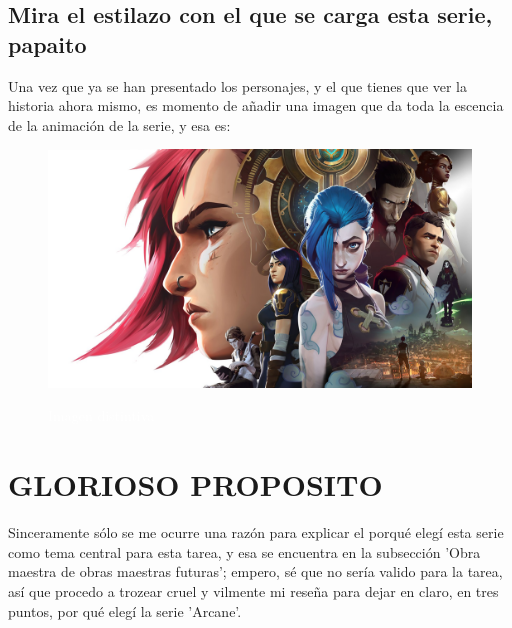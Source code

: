 \documentclass[11pt,A5]{article}
\begin{document}
    \subsection*{{\large{\textsf{\hspace{1cm}Mira el estilazo con el que se carga esta serie, papaito}}}}

Una vez que ya se han presentado los personajes, y el que tienes que ver la historia ahora mismo, es momento de añadir una imagen que da toda la escencia de la animación de la serie, y esa es:

\begin{figure}
    \raggedleft
    \caption*{\textcolor{white}{Imagen distintiva}}
    \includegraphics[scale=0.32, angle=15]{Pelicula. Imagenes usadas/Imagen representativa de Arcane.jpg}
    \label{fig:my_label}
\end{figure}

\newpage

    \pagestyle{fancy}
            \fancyhf{}
            \rhead{\textcolor{white}{\thepage}}
            \cfoot{\textcolor{white}{Jordán Aarón Duarte Martínez}}

\section*{\Large{\textsf{\hspace{1.8cm}GLORIOSO PROPOSITO}}}

Sinceramente sólo se me ocurre una razón para explicar el porqué elegí esta serie como tema central para esta tarea, y esa se encuentra en la subsección 'Obra maestra de obras maestras futuras'; empero, sé que no sería valido para la tarea, así que procedo a trozear cruel y vilmente mi reseña para dejar en claro, en tres puntos, por qué elegí la serie 'Arcane'.\newline
\end{document}
